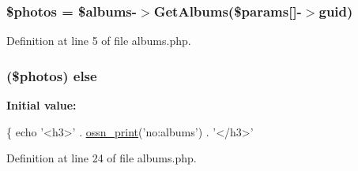 \subsubsection[{\texorpdfstring{\$photos}{$photos}}]{\setlength{\rightskip}{0pt plus 5cm}\$photos = \$albums-\/$>$Get\+Albums(\$params\mbox{[}\textquotesingle{}\mbox{]}-\/$>$guid)}\hypertarget{modules_2profile_2albums_8php_a7d16539c7a3688bee1d3184c81c47487}{}\label{modules_2profile_2albums_8php_a7d16539c7a3688bee1d3184c81c47487}


Definition at line 5 of file albums.\+php.

\subsubsection[{\texorpdfstring{else}{else}}]{ (\$photos) else}\hypertarget{modules_2profile_2albums_8php_a939f7aa0cb33e5aaa7822448d0856acb}{}\label{modules_2profile_2albums_8php_a939f7aa0cb33e5aaa7822448d0856acb}
{\bfseries Initial value\+:}
\begin{DoxyCode}
\{
    echo \textcolor{stringliteral}{'<h3>'} . \hyperlink{ossn_8lib_8languages_8php_a2be5d1c4b695593a9b9067b96df2150a}{ossn\_print}(\textcolor{stringliteral}{'no:albums'}) . \textcolor{stringliteral}{'</h3>'}
\end{DoxyCode}


Definition at line 24 of file albums.\+php.

